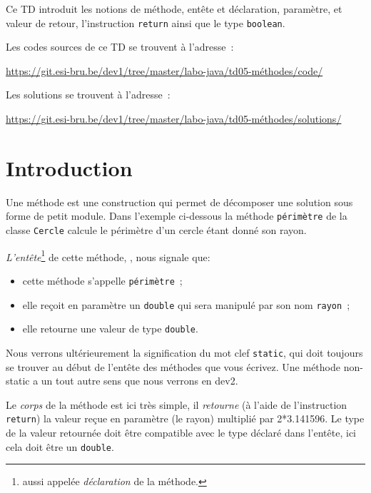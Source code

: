 \documentclass[a4paper,11pt]{article}
\date{2018 -- 2019}
\newcommand{\publicbasepath}{https://git.esi-bru.be/dev1/tree/master/labo-java/td05-méthodes}
\newcommand{\solutionspublicpath}{\publicbasepath/solutions/}
\renewcommand{\listingpublicpath}{\publicbasepath/code/}
\begin{document}
\entete
\titre
{}
\lastedit


	Ce TD introduit les notions de méthode, entête et déclaration, paramètre, et valeur de retour, l'instruction \texttt{return}
	 ainsi que le type \texttt{boolean}.
	 
	 
	Les codes sources de ce TD se trouvent à l'adresse~: 
	
	\url{\listingpublicpath}
	
	Les solutions se trouvent à l'adresse~:
	
	\url{\solutionspublicpath}

	\tableofcontents

	\newpage

\section{Introduction}

	Une méthode est une construction qui permet de décomposer une solution sous forme de petit module.
	Dans l'exemple ci-dessous la méthode \texttt{périmètre} de la classe \texttt{Cercle} calcule le périmètre d'un cercle 
	étant donné son rayon.
	
	

	\emph{L'entête}\footnote{aussi appelée \emph{déclaration} de la méthode. } de cette méthode, ,  nous signale que:
	\begin{itemize}
		\item cette méthode s'appelle \texttt{périmètre}~;
		\item elle reçoit en paramètre un \texttt{double} qui sera manipulé par son nom \texttt{rayon}~;
		\item elle retourne une valeur de type \texttt{double}.
	\end{itemize}
	Nous verrons ultérieurement la signification du mot clef \texttt{static}, qui doit toujours se trouver au début de l'entête des méthodes
	que vous écrivez. Une méthode non-static a un tout autre sens que nous verrons en dev2.

	Le \emph{corps} de la méthode est ici très simple, il \emph{retourne} (à l'aide de l'instruction  \texttt{return})
	 la valeur reçue en paramètre (le rayon) multiplié par 2*3.141596.
	Le type de la valeur retournée doit être compatible avec le type déclaré dans l'entête, 
	ici cela doit être un \texttt{double}.	
	
\end{document}
